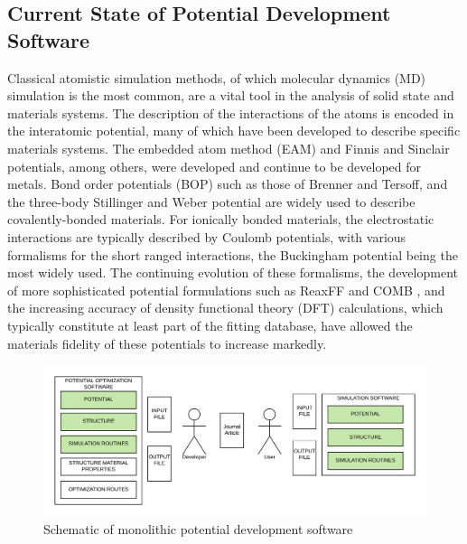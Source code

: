 \subsection{Current State of Potential Development Software}

Classical atomistic simulation methods, of which molecular dynamics (MD) simulation\cite{allen1987_md,haile1992_md,lesar2013_md,frenkel2002_md} is the most common, are a vital tool in the analysis of solid state and materials systems.
The description of the interactions of the atoms is encoded in the interatomic potential, many of which have been developed to describe specific materials systems.
The embedded atom method (EAM)\cite{daw1983_eam,daw1984_eam,daw1993_eam_review,foiles2012_eam_review} and Finnis and Sinclair\cite{finnis1984_fs} potentials, among others, were developed and continue to be developed for metals.
Bond order potentials (BOP) such as those of Brenner\cite{brenner1989_bop,brenner2002_rebo} and Tersoff\cite{tersoff1988_tersoff}, and the three-body Stillinger and Weber\cite{stillinger1985_sw} potential are widely used to describe covalently-bonded materials.
For ionically bonded materials, the electrostatic interactions are typically described by Coulomb potentials, with various formalisms for the short ranged interactions, the Buckingham potential being the most widely used.\cite{lewis1985_buck,gale1996_buck}
The continuing evolution of these formalisms, the development of more sophisticated potential formulations such as ReaxFF\cite{vanduin2001_reaxff,senftle2016_reaxff} and COMB \cite{liang2013_comb_1,liang2013_comb_2}, and the increasing accuracy of density functional theory (DFT) calculations, which typically constitute at least part of the fitting database, have allowed the materials fidelity of these potentials to increase markedly.

\begin{figure}[ht]
	\centering
	\includegraphics[width=5in]{chapter6/img/fig_potdev_monolithic}
	\caption{Schematic of monolithic potential development software}
	\label{fig:potdev_monolithic}
\end{figure}

